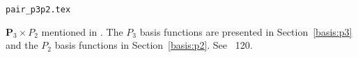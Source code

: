 \begin{flushright} {\tiny {\color{gray} \tt pair\_p3p2.tex}} \end{flushright}

${\bm P}_3\times P_2$ mentioned in \textcite{sten90}.
The $P_3$ basis functions are presented in Section~\ref{basis:p3} and the $P_2$ basis
functions in Section~\ref{basis:p2}.
See \stone~120.

